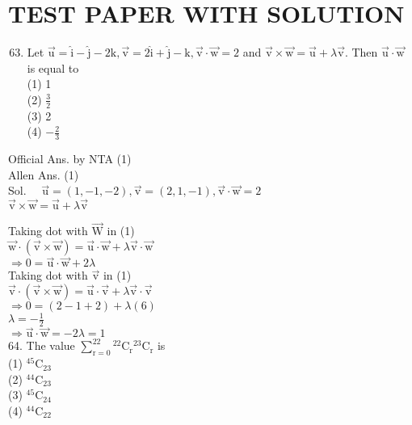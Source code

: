 \documentclass[10pt]{article}
\begin{document}
\section*{TEST PAPER WITH SOLUTION}
\begin{enumerate}
  \setcounter{enumi}{62}
  \item Let \(\overrightarrow{\mathrm{u}}=\hat{\mathrm{i}}-\hat{\mathrm{j}}-2 \mathrm{k}, \overrightarrow{\mathrm{v}}=2 \hat{\mathrm{i}}+\hat{\mathrm{j}}-\mathrm{k}, \overrightarrow{\mathrm{v}} \cdot \overrightarrow{\mathrm{w}}=2\) and \(\overrightarrow{\mathrm{v}} \times \overrightarrow{\mathrm{w}}=\overrightarrow{\mathrm{u}}+\lambda \overrightarrow{\mathrm{v}}\). Then \(\overrightarrow{\mathrm{u}} \cdot \overrightarrow{\mathrm{w}}\) is equal to\\
(1) 1\\
(2) \(\frac{3}{2}\)\\
(3) 2\\
(4) \(-\frac{2}{3}\)
\end{enumerate}

Official Ans. by NTA (1)\\
Allen Ans. (1)\\
Sol. \(\quad \overrightarrow{\mathrm{u}}=(1,-1,-2), \overrightarrow{\mathrm{v}}=(2,1,-1), \overrightarrow{\mathrm{v}} \cdot \overrightarrow{\mathrm{w}}=2\)\\
\(\overrightarrow{\mathrm{v}} \times \overrightarrow{\mathrm{w}}=\overrightarrow{\mathrm{u}}+\lambda \overrightarrow{\mathrm{v}}\)

Taking dot with \(\overrightarrow{\mathrm{W}}\) in (1)\\
\(\overrightarrow{\mathrm{w}} \cdot(\overrightarrow{\mathrm{v}} \times \overrightarrow{\mathrm{w}})=\overrightarrow{\mathrm{u}} \cdot \overrightarrow{\mathrm{w}}+\lambda \overrightarrow{\mathrm{v}} \cdot \overrightarrow{\mathrm{w}}\)\\
\(\Rightarrow 0=\overrightarrow{\mathrm{u}} \cdot \overrightarrow{\mathrm{w}}+2 \lambda\)\\
Taking dot with \(\overrightarrow{\mathrm{v}}\) in (1)\\
\(\overrightarrow{\mathrm{v}} \cdot(\overrightarrow{\mathrm{v}} \times \overrightarrow{\mathrm{w}})=\overrightarrow{\mathrm{u}} \cdot \overrightarrow{\mathrm{v}}+\lambda \overrightarrow{\mathrm{v}} \cdot \overrightarrow{\mathrm{v}}\)\\
\(\Rightarrow 0=(2-1+2)+\lambda(6)\)\\
\(\lambda=-\frac{1}{2}\)\\
\(\Rightarrow \overrightarrow{\mathrm{u}} \cdot \overrightarrow{\mathrm{w}}=-2 \lambda=1\)\\
64. The value \(\sum_{\mathrm{r}=0}^{22}{ }^{22} \mathrm{C}_{\mathrm{r}}{ }^{23} \mathrm{C}_{\mathrm{r}}\) is\\
(1) \({ }^{45} \mathrm{C}_{23}\)\\
(2) \({ }^{44} \mathrm{C}_{23}\)\\
(3) \({ }^{45} \mathrm{C}_{24}\)\\
(4) \({ }^{44} \mathrm{C}_{22}\)
\end{document}
